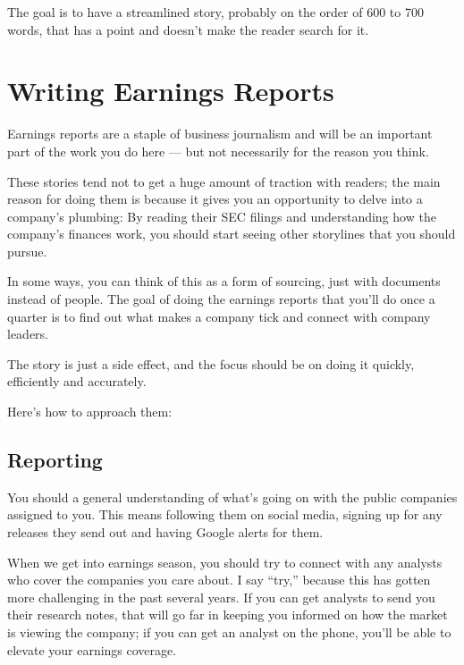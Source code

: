 \documentclass[
  11pt,
  american,
  letterpaperpaper,
  extrafontsizes,onecolumn,openright
  ]{memoir}
\begin{document}
The goal is to have a streamlined story, probably on the order of 600 to 700 words, that has a point and doesn't make the reader search for it.

\hypertarget{writing-earnings-reports}{%
\chapter{Writing Earnings Reports}\label{writing-earnings-reports}}

Earnings reports are a staple of business journalism and will be an important part of the work you do here --- but not necessarily for the reason you think.

These stories tend not to get a huge amount of traction with readers; the main reason for doing them is because it gives you an opportunity to delve into a company's plumbing: By reading their SEC filings and understanding how the company's finances work, you should start seeing other storylines that you should pursue.

In some ways, you can think of this as a form of sourcing, just with documents instead of people. The goal of doing the earnings reports that you'll do once a quarter is to find out what makes a company tick and connect with company leaders.

The story is just a side effect, and the focus should be on doing it quickly, efficiently and accurately.

Here's how to approach them:

\hypertarget{reporting}{%
\section*{Reporting}\label{reporting}}

You should a general understanding of what's going on with the public companies assigned to you. This means following them on social media, signing up for any releases they send out and having Google alerts for them.

When we get into earnings season, you should try to connect with any analysts who cover the companies you care about. I say \enquote{try,} because this has gotten more challenging in the past several years. If you can get analysts to send you their research notes, that will go far in keeping you informed on how the market is viewing the company; if you can get an analyst on the phone, you'll be able to elevate your earnings coverage.
\end{document}
